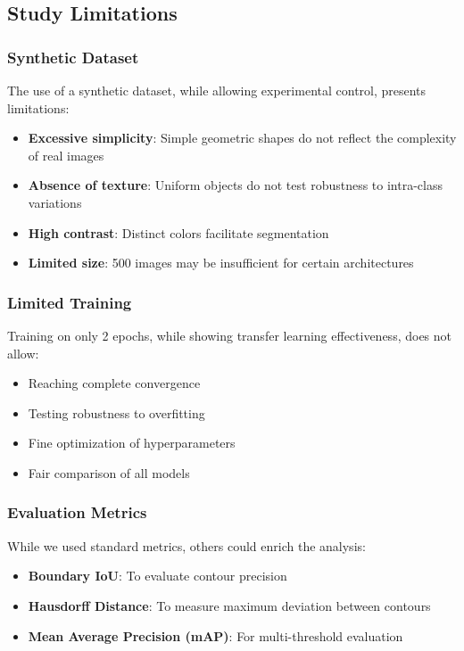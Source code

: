 \documentclass[12pt,a4paper]{article}
\begin{document}
\subsection{Study Limitations}

\subsubsection{Synthetic Dataset}

The use of a synthetic dataset, while allowing experimental control, presents limitations:
\begin{itemize}
    \item \textbf{Excessive simplicity}: Simple geometric shapes do not reflect the complexity of real images
    \item \textbf{Absence of texture}: Uniform objects do not test robustness to intra-class variations
    \item \textbf{High contrast}: Distinct colors facilitate segmentation
    \item \textbf{Limited size}: 500 images may be insufficient for certain architectures
\end{itemize}

\subsubsection{Limited Training}

Training on only 2 epochs, while showing transfer learning effectiveness, does not allow:
\begin{itemize}
    \item Reaching complete convergence
    \item Testing robustness to overfitting
    \item Fine optimization of hyperparameters
    \item Fair comparison of all models
\end{itemize}

\subsubsection{Evaluation Metrics}

While we used standard metrics, others could enrich the analysis:
\begin{itemize}
    \item \textbf{Boundary IoU}: To evaluate contour precision
    \item \textbf{Hausdorff Distance}: To measure maximum deviation between contours
    \item \textbf{Mean Average Precision (mAP)}: For multi-threshold evaluation
\end{itemize}
\end{document}
